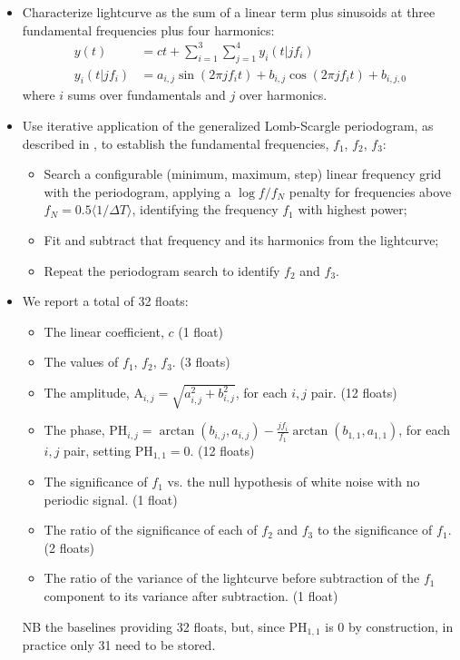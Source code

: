 \begin{itemize}

\item{Characterize lightcurve as the sum of a linear term plus sinusoids at three fundamental frequencies plus four harmonics:
\begin{align}
y(t) &= ct + \sum_{i=1}^{3} \sum_{j=1}^{4} y_i(t|j f_i) \\
y_i(t|j f_i) &= a_{i,j} \sin(2 \pi j f_i t) + b_{i, j} \cos(2 \pi j f_i t) + b_{i, j, 0}
\end{align}
where $i$ sums over fundamentals and $j$ over harmonics.
}
\item{Use iterative application of the generalized Lomb-Scargle periodogram, as described in \cite{Richards11}, to establish the fundamental frequencies, $f_1$, $f_2$, $f_3$:
\begin{itemize}
  \item{Search a configurable (minimum, maximum, step) linear frequency grid with the periodogram, applying a $\log f/f_N$ penalty for frequencies above $f_N = 0.5 \langle 1 / \Delta T \rangle$, identifying the frequency $f_1$ with highest power;}
  \item{Fit and subtract that frequency and its harmonics from the lightcurve;}
  \item{Repeat the periodogram search to identify $f_2$ and $f_3$.}
\end{itemize}
}
\item{We report a total of 32 floats:
  \begin{itemize}
  \item{The linear coefficient, $c$ (1 float)}
  \item{The values of $f_1$, $f_2$, $f_3$. (3 floats)}
  \item{The amplitude, $\mathrm{A}_{i, j} = \sqrt{a_{i, j}^2 + b_{i, j}^2}$, for each $i, j$ pair. (12 floats)}
  \item{The phase, $\mathrm{PH}_{i, j} = \arctan(b_{i, j}, a_{i, j}) - \frac{j f_i}{f_1} \arctan(b_{1,1}, a_{1,1})$, for each $i, j$ pair, setting $\mathrm{PH}_{1, 1} = 0$. (12 floats)}
  \item{The significance of $f_1$ vs. the null hypothesis of white noise with no periodic signal. (1 float)}
  \item{The ratio of the significance of each of $f_2$ and $f_3$ to the significance of $f_1$. (2 floats)}
  \item{The ratio of the variance of the lightcurve before subtraction of the $f_1$ component to its variance after subtraction. (1 float)}
  \end{itemize}
NB the \DPDD{} baselines providing 32 floats, but, since $\mathrm{PH}_{1,1}$ is 0 by construction, in practice only 31 need to be stored.
}
\end{itemize}

